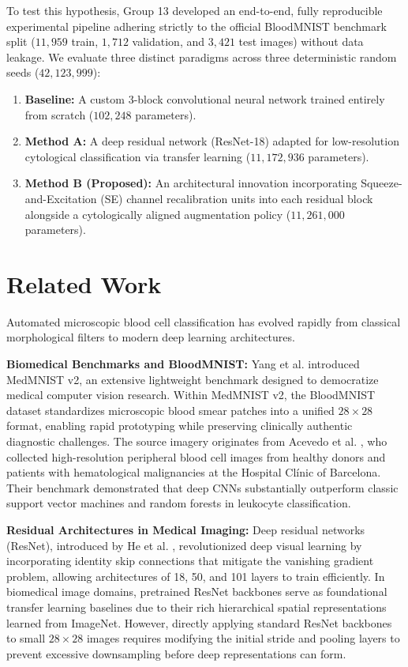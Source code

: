 \documentclass[conference]{IEEEtran}
\begin{document}
To test this hypothesis, Group 13 developed an end-to-end, fully reproducible experimental pipeline adhering strictly to the official BloodMNIST benchmark split ($11,959$ train, $1,712$ validation, and $3,421$ test images) without data leakage. We evaluate three distinct paradigms across three deterministic random seeds ($42, 123, 999$):
\begin{enumerate}
    \item \textbf{Baseline:} A custom 3-block convolutional neural network trained entirely from scratch ($102,248$ parameters).
    \item \textbf{Method A:} A deep residual network (ResNet-18) adapted for low-resolution cytological classification via transfer learning ($11,172,936$ parameters).
    \item \textbf{Method B (Proposed):} An architectural innovation incorporating Squeeze-and-Excitation (SE) channel recalibration units into each residual block alongside a cytologically aligned augmentation policy ($11,261,000$ parameters).
\end{enumerate}

\section{Related Work}
Automated microscopic blood cell classification has evolved rapidly from classical morphological filters to modern deep learning architectures.

\textbf{Biomedical Benchmarks and BloodMNIST:} Yang et al. \cite{yang2023medmnist} introduced MedMNIST v2, an extensive lightweight benchmark designed to democratize medical computer vision research. Within MedMNIST v2, the BloodMNIST dataset standardizes microscopic blood smear patches into a unified $28 \times 28$ format, enabling rapid prototyping while preserving clinically authentic diagnostic challenges. The source imagery originates from Acevedo et al. \cite{acevedo2020dataset}, who collected high-resolution peripheral blood cell images from healthy donors and patients with hematological malignancies at the Hospital Cl\'{i}nic of Barcelona. Their benchmark demonstrated that deep CNNs substantially outperform classic support vector machines and random forests in leukocyte classification.

\textbf{Residual Architectures in Medical Imaging:} Deep residual networks (ResNet), introduced by He et al. \cite{he2016deep}, revolutionized deep visual learning by incorporating identity skip connections that mitigate the vanishing gradient problem, allowing architectures of 18, 50, and 101 layers to train efficiently. In biomedical image domains, pretrained ResNet backbones serve as foundational transfer learning baselines due to their rich hierarchical spatial representations learned from ImageNet. However, directly applying standard ResNet backbones to small $28 \times 28$ images requires modifying the initial stride and pooling layers to prevent excessive downsampling before deep representations can form.
\end{document}
